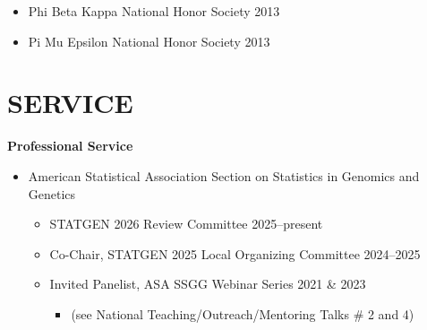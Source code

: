 \documentclass[margin]{res}
\newcommand{\annotateItem}[1]{
	\begin{itemize} \vspace{-0.1cm}
	\item[] 
	\begin{footnotesize}\textcolor{black}{(#1)}\end{footnotesize}
	\end{itemize} \vspace{-0.1cm}
}
\begin{document}
\begin{resume}
\begin{itemize}
\item Phi Beta Kappa National Honor Society \hfill 2013 

\item Pi Mu Epsilon National Honor Society \hfill 2013 %


\end{itemize}







\section{SERVICE}  

\textbf{Professional Service}
	\begin{itemize}
	
	\item American Statistical Association Section on Statistics in Genomics and Genetics
		\begin{itemize}
		
		\item STATGEN 2026 Review Committee \hfill 2025--present
		
		\item Co-Chair, STATGEN 2025 Local Organizing Committee \hfill 2024--2025
		
		\item Invited Panelist, ASA SSGG Webinar Series \hfill 2021 \& 2023 
			\begin{itemize}[leftmargin=-0in] \vspace{-0.2cm}
			\item[] \begin{footnotesize}(see National Teaching/Outreach/Mentoring Talks \# 2 and 4) \end{footnotesize}
			\end{itemize} %
		

\end{itemize}
\end{itemize}
\end{resume}
\end{document}

